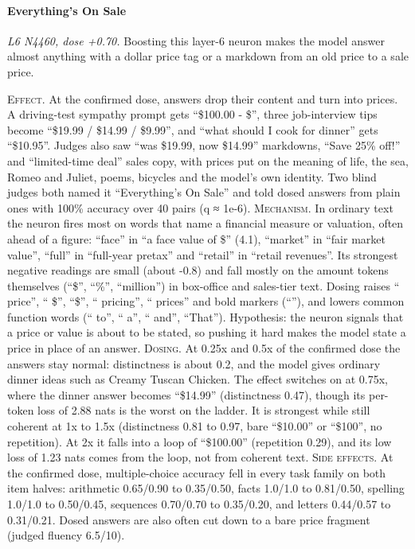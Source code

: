\paragraph{Everything's On Sale} \textit{L6 N4460, dose +0.70.} Boosting this layer-6 neuron makes the model answer almost anything with a dollar price tag or a markdown from an old price to a sale price.

\noindent\textsc{Effect.} At the confirmed dose, answers drop their content and turn into prices. A driving-test sympathy prompt gets “\$100.00 - \$”, three job-interview tips become “\$19.99 / \$14.99 / \$9.99”, and “what should I cook for dinner” gets “\$10.95”. Judges also saw “was \$19.99, now \$14.99” markdowns, “Save 25\% off!” and “limited-time deal” sales copy, with prices put on the meaning of life, the sea, Romeo and Juliet, poems, bicycles and the model's own identity. Two blind judges both named it “Everything's On Sale” and told dosed answers from plain ones with 100\% accuracy over 40 pairs (q ≈ 1e-6). \textsc{Mechanism.} In ordinary text the neuron fires most on words that name a financial measure or valuation, often ahead of a figure: “face” in “a face value of \$” (4.1), “market” in “fair market value”, “full” in “full-year pretax” and “retail” in “retail revenues”. Its strongest negative readings are small (about -0.8) and fall mostly on the amount tokens themselves (“\$”, “\%”, “million”) in box-office and sales-tier text. Dosing raises “ price”, “ \$”, “\$”, “ pricing”, “ prices” and bold markers (“”), and lowers common function words (“ to”, “ a”, “ and”, “That”). Hypothesis: the neuron signals that a price or value is about to be stated, so pushing it hard makes the model state a price in place of an answer. \textsc{Dosing.} At 0.25x and 0.5x of the confirmed dose the answers stay normal: distinctness is about 0.2, and the model gives ordinary dinner ideas such as Creamy Tuscan Chicken. The effect switches on at 0.75x, where the dinner answer becomes “\$14.99” (distinctness 0.47), though its per-token loss of 2.88 nats is the worst on the ladder. It is strongest while still coherent at 1x to 1.5x (distinctness 0.81 to 0.97, bare “\$10.00” or “\$100”, no repetition). At 2x it falls into a loop of “\$100.00” (repetition 0.29), and its low loss of 1.23 nats comes from the loop, not from coherent text. \textsc{Side effects.} At the confirmed dose, multiple-choice accuracy fell in every task family on both item halves: arithmetic 0.65/0.90 to 0.35/0.50, facts 1.0/1.0 to 0.81/0.50, spelling 1.0/1.0 to 0.50/0.45, sequences 0.70/0.70 to 0.35/0.20, and letters 0.44/0.57 to 0.31/0.21. Dosed answers are also often cut down to a bare price fragment (judged fluency 6.5/10).

